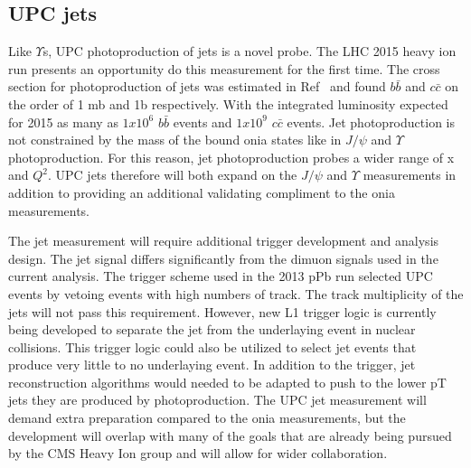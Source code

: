     \subsection{UPC jets}
      Like $\Upsilon$s, UPC photoproduction of jets is a novel probe.
      The LHC 2015 heavy ion run presents an opportunity do this measurement 
        for the first time. 
      The cross section for photoproduction of jets was estimated in 
      Ref~\cite{upcJets1} and found $b\bar{b}$ and $c\bar{c}$ on the order of 
        1 mb and 1b respectively.
      With the integrated luminosity expected for 2015 as many as $1x10^{6}$
        $b\bar{b}$ events and $1x10^{9}$ $c\bar{c}$ events. 
      Jet photoproduction is not constrained by the mass of the bound onia 
        states like in $J/\psi$ and $\Upsilon$ photoproduction. 
      For this reason, jet photoproduction probes a wider range of x and 
        $Q^{2}$.
      UPC jets therefore will both expand on the $J/\psi$ and $\Upsilon$ 
        measurements in addition to providing an additional validating 
        compliment to the onia measurements.

      The jet measurement will require additional trigger development and 
        analysis design. 
      The jet signal differs significantly from the dimuon signals used in the
        current analysis. 
      The trigger scheme used in the 2013 pPb run selected UPC events by 
        vetoing events with high numbers of track. 
      The track multiplicity of the jets will not pass this requirement. 
      However, new L1 trigger logic is currently being developed to separate 
        the jet from the underlaying event in nuclear collisions. 
      This trigger logic could also be utilized to select jet events that
        produce very little to no underlaying event. 
      In addition to the trigger, jet reconstruction algorithms would needed 
        to be adapted to push to the lower pT jets they are produced by 
        photoproduction. 
      The UPC jet measurement will demand extra preparation compared to the 
        onia measurements, but the development will overlap with many of the 
        goals that are already being pursued by the CMS Heavy Ion group and 
        will allow for wider collaboration. 

